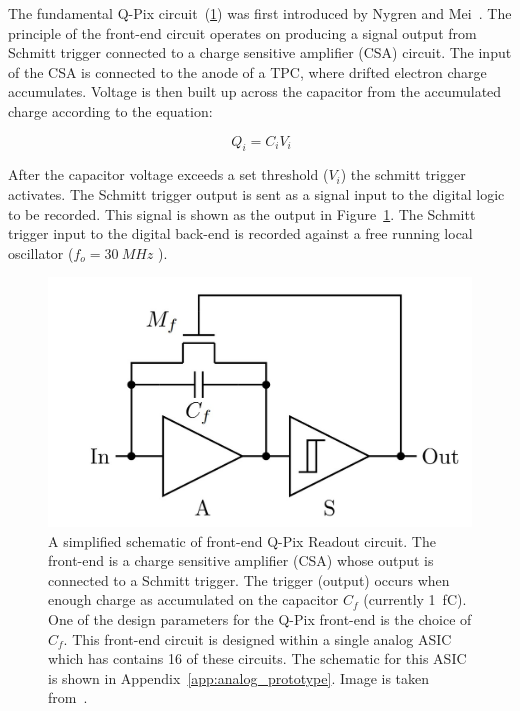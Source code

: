 The fundamental Q-Pix circuit~(\ref{fig:qpixCircuit}) was first introduced by Nygren and Mei~\citep{qpix:nygren:mei}.
The principle of the front-end circuit operates on producing a signal output from Schmitt trigger connected to a charge sensitive amplifier (CSA) circuit.
The input of the CSA is connected to the anode of a TPC, where drifted electron charge accumulates.
Voltage is then built up across the capacitor from the accumulated charge according to the equation:

\begin{equation}~\label{eq:capacitor}
Q_{i} = C_{i}V_{i}
\end{equation}

After the capacitor voltage exceeds a set threshold ($V_{i}$) the schmitt trigger activates.
The Schmitt trigger output is sent as a signal input to the digital logic to be recorded.
This signal is shown as the output in Figure~\ref{fig:qpixCircuit}.
The Schmitt trigger input to the digital back-end is recorded against a free running local oscillator ($f_{o} = 30~\unit{MHz}$ ).

\begin{figure}[]
\centering
\includegraphics[width=\textwidth]{images/qpix_circuit.jpg}
\caption{A simplified schematic of front-end Q-Pix Readout circuit.
The front-end is a charge sensitive amplifier (CSA) whose output is connected to a Schmitt trigger.
The trigger (output) occurs when enough charge as accumulated on the capacitor $C_{f}$ (currently 1~\unit{fC}).
One of the design parameters for the Q-Pix front-end is the choice of $C_{f}$.
This front-end circuit is designed within a single analog ASIC which has contains 16 of these circuits.
The schematic for this ASIC is shown in Appendix~\ref{app:analog_prototype}.
Image is taken from~\citep{qpix:nygren:mei}.}
\label{fig:qpixCircuit}
\end{figure}

